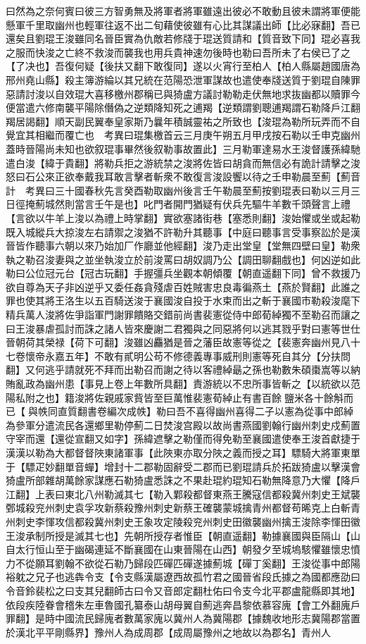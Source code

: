 曰然為之奈何賓曰彼三方智勇無及將軍者將軍雖遠出彼必不敢動且彼未謂將軍便能懸軍千里取幽州也輕軍往返不出二旬藉使彼雖有心比其謀議出師【比必寐翻】吾已還矣且劉琨王浚雖同名晉臣實為仇敵若修牋于琨送質請和【質音致下同】琨必喜我之服而快浚之亡終不救浚而襲我也用兵貴神速勿後時也勒曰吾所未了右侯已了之【了决也】吾復何疑【後扶又翻下敢復同】遂以火宵行至柏人【柏人縣屬趙國唐為邢州堯山縣】殺主簿游綸以其兄統在范陽恐泄軍謀故也遣使奉牋送質于劉琨自陳罪惡請討浚以自效琨大喜移檄州郡稱已與猗盧方議討勒勒走伏無地求抜幽都以贖罪今便當遣六修南襲平陽除僭偽之逆類降知死之逋羯【逆類謂劉聰逋羯謂石勒降戶江翻羯居謁翻】順天副民翼奉皇家斯乃曩年積誠靈祐之所致也【浚琨為勒所玩弄而不自覺宜其相繼而覆亡也　考異曰琨集檄首云三月庚午朔五月甲戌按石勒以壬申克幽州蓋時晉陽尚未知也欲叙琨事畢然後叙勒事故置此】三月勒軍達易水王浚督護孫緯馳遣白浚【緯于貴翻】將勒兵拒之游統禁之浚將佐皆曰胡貪而無信必有詭計請擊之浚怒曰石公來正欲奉戴我耳敢言擊者斬衆不敢復言浚設饗以待之壬申勒晨至薊【薊音計　考異曰三十國春秋先言癸酉勒取幽州後言壬午勒晨至薊按劉琨表曰勒以三月三日徑掩薊城然則當言壬午是也】叱門者開門猶疑有伏兵先驅牛羊數千頭聲言上禮【言欲以牛羊上浚以為禮上時掌翻】實欲塞諸街巷【塞悉則翻】浚始懼或坐或起勒既入城縱兵大掠浚左右請禦之浚猶不許勒升其聽事【中庭曰聽事言受事察訟於是漢晉皆作聽事六朝以來乃始加厂作廳並他經翻】浚乃走出堂皇【堂無四壁曰皇】勒衆執之勒召浚妻與之並坐執浚立於前浚罵曰胡奴調乃公【調田聊翻戲也】何凶逆如此勒曰公位冠元台【冠古玩翻】手握彊兵坐觀本朝傾覆【朝直遥翻下同】曾不救援乃欲自尊為天子非凶逆乎又委任姦貪殘虐百姓賊害忠良毒徧燕土【燕於賢翻】此誰之罪也使其將王洛生以五百騎送浚于襄國浚自投于水束而出之斬于襄國市勒殺浚麾下精兵萬人浚將佐爭詣軍門謝罪饋賂交錯前尚書裴憲從侍中郎荀綽獨不至勒召而讓之曰王浚暴虐孤討而誅之諸人皆來慶謝二君獨與之同惡將何以逃其戮乎對曰憲等世仕晉朝荷其榮禄【荷下可翻】浚雖凶麤猶是晉之藩臣故憲等從之【裴憲奔幽州見八十七卷懷帝永嘉五年】不敢有貳明公苟不修德義專事威刑則憲等死自其分【分扶問翻】又何逃乎請就死不拜而出勒召而謝之待以客禮綽朂之孫也勒數朱碩棗嵩等以納賄亂政為幽州患【事見上卷上年數所具翻】責游統以不忠所事皆斬之【以統欲以范陽私附之也】籍浚將佐親戚家貲皆至巨萬惟裴憲荀綽止有書百餘鹽米各十餘斛而已【與帙同直質翻書卷編次成帙】勒曰吾不喜得幽州喜得二子以憲為從事中郎綽為參軍分遣流民各還鄉里勒停薊二日焚浚宫殿以故尚書燕國劉翰行幽州刺史戍薊置守宰而還【還從宣翻又如字】孫緯遮擊之勒僅而得免勒至襄國遣使奉王浚首獻捷于漢漢以勒為大都督督陜東諸軍事【此陜東亦取分陜之義而授之耳】驃騎大將軍東單于【驃疋妙翻單音蟬】增封十二郡勒固辭受二郡而已劉琨請兵於拓跋猗盧以擊漢會猗盧所部雜胡萬餘家謀應石勒猗盧悉誅之不果赴琨約琨知石勒無降意乃大懼【降戶江翻】上表曰東北八州勒滅其七【勒入鄴殺都督東燕王騰寇信都殺冀州刺史王斌襲鄄城殺兖州刺史袁孚攻新蔡殺豫州刺史新蔡王確襲蒙城擒青州都督苟晞克上白斬青州刺史李惲攻信都殺冀州刺史王象攻定陵殺兖州刺史田徽襲幽州擒王浚除李惲田徽王浚承制所授是滅其七也】先朝所授存者惟臣【朝直遥翻】勒據襄國與臣隔山【山自太行恒山至于幽碣連延不斷襄國在山東晉陽在山西】朝發夕至城塢駭懼雖懷忠憤力不從願耳劉翰不欲從石勒乃歸段匹磾匹磾遂據薊城【磾丁奚翻】王浚從事中郎陽裕躭之兄子也逃犇令支【令支縣漢屬遼西故孤竹君之國晉省段氏據之為國都應劭曰令音鈴裴松之曰支其兒翻師古曰令又音郎定翻杜佑曰令支今北平郡盧龍縣即其地】依段疾陸眷會稽朱左車魯國孔纂泰山胡母翼自薊逃奔昌黎依慕容廆【會工外翻廆戶罪翻】是時中國流民歸廆者數萬家廆以冀州人為冀陽郡【據魏收地形志冀陽郡當置於漢北平平剛縣界】豫州人為成周郡【成周屬豫州之地故以為郡名】青州人